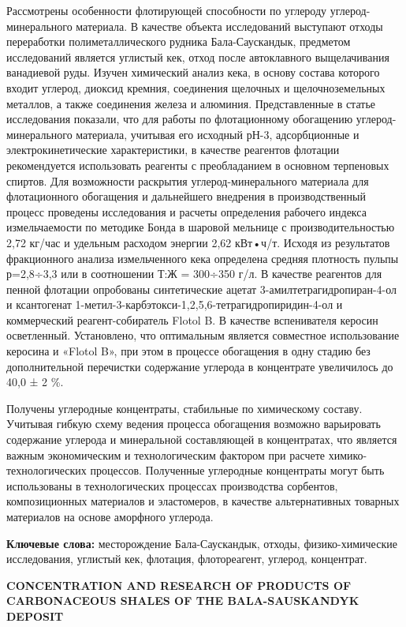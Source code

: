 Рассмотрены особенности флотирующей способности по углероду
углерод-минерального материала. В качестве объекта исследований
выступают отходы переработки полиметаллического рудника Бала-Саускандык,
предметом исследований является углистый кек, отход после автоклавного
выщелачивания ванадиевой руды. Изучен химический анализ кека, в основу
состава которого входит углерод, диоксид кремния, соединения щелочных и
щелочноземельных металлов, а также соединения железа и алюминия.
Представленные в статье исследования показали, что для работы по
флотационному обогащению углерод-минерального материала, учитывая его
исходный рН-3, адсорбционные и электрокинетические характеристики, в
качестве реагентов флотации рекомендуется использовать реагенты с
преобладанием в основном терпеновых спиртов. Для возможности раскрытия
углерод-минерального материала для флотационного обогащения и
дальнейшего внедрения в производственный процесс проведены исследования
и расчеты определения рабочего индекса измельчаемости по методике Бонда
в шаровой мельнице с производительностью 2,72 кг/час и удельным расходом
энергии 2,62 кВт•ч/т. Исходя из результатов фракционного анализа
измельченного кека определена средняя плотность пульпы р=2,8÷3,3 или в
соотношении Т:Ж = 300÷350 г/л. В качестве реагентов для пенной флотации
опробованы синтетические ацетат 3-амилтетрагидропиран-4-ол и ксантогенат
1-метил-3-карбэтокси-1,2,5,6-тетрагидропиридин-4-ол и коммерческий
реагент-собиратель Flotol B. В качестве вспенивателя керосин
осветленный. Установлено, что оптимальным является совместное
использование керосина и «Flotol B», при этом в процессе обогащения в
одну стадию без дополнительной перечистки содержание углерода в
концентрате увеличилось до 40,0 ± 2 \%.

Получены углеродные концентраты, стабильные по химическому составу.
Учитывая гибкую схему ведения процесса обогащения возможно варьировать
содержание углерода и минеральной составляющей в концентратах, что
является важным экономическим и технологическим фактором при расчете
химико-технологических процессов. Полученные углеродные концентраты
могут быть использованы в технологических процессах производства
сорбентов, композиционных материалов и эластомеров, в качестве
альтернативных товарных материалов на основе аморфного углерода.

\textbf{Ключевые слова:} месторождение Бала-Саускандык, отходы,
физико-химические исследования, углистый кек, флотация, флотореагент,
углерод, концентрат.

\textbf{CONCENTRATION AND RESEARCH OF PRODUCTS OF CARBONACEOUS SHALES OF
THE BALA-SAUSKANDYK DEPOSIT}

